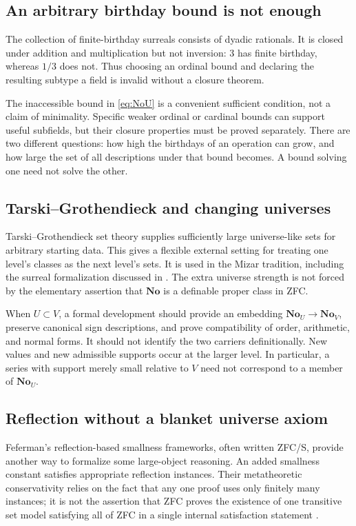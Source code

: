\documentclass[11pt,letterpaper]{article}
\theoremstyle{definition}
\theoremstyle{remark}
\newcommand{\No}{\mathbf{No}}
\numberwithin{equation}{section}
\begin{document}
\subsection{An arbitrary birthday bound is not enough}
The collection of finite-birthday surreals consists of dyadic rationals. It is closed under addition and multiplication but not inversion: \(3\) has finite birthday, whereas \(1/3\) does not. Thus choosing an ordinal bound and declaring the resulting subtype a field is invalid without a closure theorem.

The inaccessible bound in \eqref{eq:NoU} is a convenient sufficient condition, not a claim of minimality. Specific weaker ordinal or cardinal bounds can support useful subfields, but their closure properties must be proved separately. There are two different questions: how high the birthdays of an operation can grow, and how large the set of all descriptions under that bound becomes. A bound solving one need not solve the other.

\subsection{Tarski--Grothendieck and changing universes}
Tarski--Grothendieck set theory supplies sufficiently large universe-like sets for arbitrary starting data. This gives a flexible external setting for treating one level's classes as the next level's sets. It is used in the Mizar tradition, including the surreal formalization discussed in \cite{PakKaliszyk}. The extra universe strength is not forced by the elementary assertion that \(\No\) is a definable proper class in ZFC.

When \(U\subset V\), a formal development should provide an embedding
\(\No_U\to\No_V\), preserve canonical sign descriptions, and prove compatibility of order, arithmetic, and normal forms. It should not identify the two carriers definitionally. New values and new admissible supports occur at the larger level. In particular, a series with support merely small relative to \(V\) need not correspond to a member of \(\No_U\).

\subsection{Reflection without a blanket universe axiom}
Feferman's reflection-based smallness frameworks, often written ZFC/S, provide another way to formalize some large-object reasoning. An added smallness constant satisfies appropriate reflection instances. Their metatheoretic conservativity relies on the fact that any one proof uses only finitely many instances; it is not the assertion that ZFC proves the existence of one transitive set model satisfying all of ZFC in a single internal satisfaction statement \cite[\S11]{ShulmanSize}.
\end{document}
